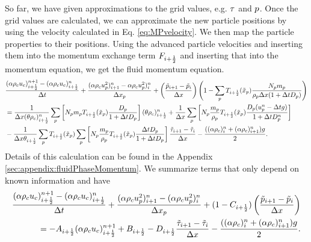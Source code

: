 So far, we have given approximations to the grid values, e.g. $\ss$ and $\p$.
Once the grid values are calculated, we can approximate the new particle positions by using the velocity calculated in Eq. \eqref{eq:MPvelocity}.
We then map the particle properties to their positions.
Using the advanced particle velocities and inserting them into the momentum exchange term $\F_{i+\frac{1}{2}}$ and inserting that into the momentum equation, we get the fluid momentum equation.
\begin{equation}
\begin{aligned}
\label{eq:momentumEquationFluidDisc}
    &\dfrac{(\fvf \rf \uf)_{i+\frac{1}{2}}^{n+1}- (\fvf \rf \uf)_{i+\frac{1}{2}}^{n}}{\Delta \tvar} + \dfrac{(\fvf \rf \up^2)^n_{i+1}-\fvf \rf \up^2)^n_{i}}{\Delta \xp}
    +  \left( \dfrac{\tilde{\p}_{i+1} - \tilde{\p}_i}{\Delta \x} \right) 
    \left( 1 - \sum_p \ifg_{i+\frac{1}{2}} (\xpp) \dfrac{\Np \mp}{\rp \Delta \x (1 + \Delta \tvar \d)} \right) \\
    &=
    \dfrac{1}{\Delta \x (\pvf \rf)_{i+\frac{1}{2}}^n} \sum_p \left[ \Np \mp \ifg_{i+\frac{1}{2}} (\xpp) \frac{\d}{1+ \Delta \tvar \d}\right] (\pvf \rf)_{i+\frac{1}{2}}^n
    + \dfrac{1}{\Delta \x} \sum_p \left[ \Np \dfrac{\mp}{\rp} \ifg_{i+\frac{1}{2}} (\xpp) \dfrac{\d (\up^n - \Delta \tvar \g)}{1 + \Delta \tvar \d^n}\right] \\
    &- \dfrac{1}{\Delta x \theta_{i+\frac{1}{2}}} \sum_{p} \ifg_{i+\frac{1}{2}} (\xpp) \sum_p \left[ \Np \dfrac{\mp}{\rp} \ifg_{i+\frac{1}{2}} (\xpp) \dfrac{\Delta \tvar \d}{1 + \Delta \tvar \d}  \right] \dfrac{\tilde{\ss}_{i+1} - \tilde{\ss}_{i}}{\Delta \x}    
    -\dfrac{((\fvf \rf)_i^n + (\fvf \rf)_{i+1}^n)\g}{2}.
\end{aligned}
\end{equation}
Details of this calculation can be found in the Appendix \ref{sec:appendix:fluidPhaseMomentum}.
We summarize terms that only depend on known information and have
\begin{equation}
    \begin{aligned}
    \dfrac{(\fvf \rf \uf)_{i+\frac{1}{2}}^{n+1}- (\fvf \rf \uf)_{i+\frac{1}{2}}^{n}}{\Delta \tvar} + \dfrac{(\fvf \rf \up^2)^n_{i+1}-(\fvf \rf \up^2)^n_{i}}{\Delta \xp}
    +  (1-C_{i+\frac{1}{2}}) \left( \dfrac{\tilde{\p}_{i+1} - \tilde{\p}_i}{\Delta \x} \right) \\ 
    = - A_{i+\frac{1}{2}} (\fvf \rf \uf)_{i+\frac{1}{2}}^{n+1}
    + B_{i+\frac{1}{2}} - D_{i+\frac{1}{2}} \dfrac{\tilde{\ss}_{i+1} - \tilde{\ss}_{i}}{\Delta \x}    
    -\dfrac{((\fvf \rf)_i^n + (\fvf \rf)_{i+1}^n)\g}{2}.
    \end{aligned}
\end{equation}



